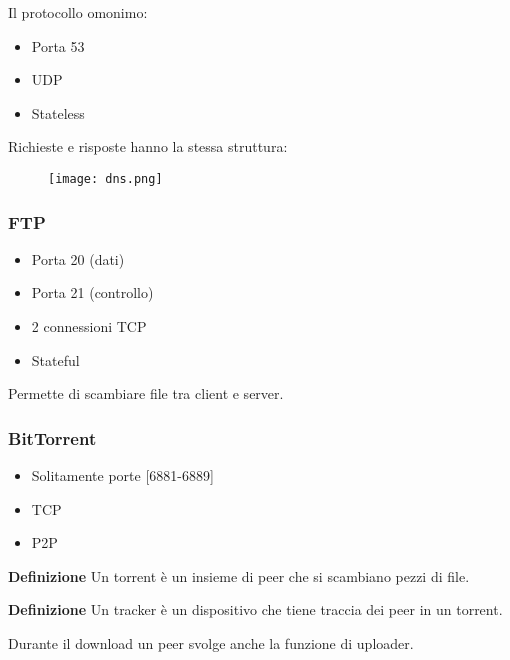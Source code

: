 \documentclass{article}
\begin{document}
\noindent Il protocollo omonimo:
\begin{itemize}
    \item Porta 53
    \item UDP
    \item Stateless\newline
\end{itemize}

\noindent Richieste e risposte hanno la stessa struttura:

\begin{figure}[ht]
    \centering
    \texttt{[image: dns.png]}
    \label{fig:dns}
\end{figure}

\newpage

\subsubsection{FTP}
\begin{itemize}
    \item Porta 20 (dati)
    \item Porta 21 (controllo)
    \item 2 connessioni TCP
    \item Stateful\newline
\end{itemize}

\noindent Permette di scambiare file tra client e server.\newline

\subsubsection{BitTorrent}
\begin{itemize}
    \item Solitamente porte [6881-6889]
    \item TCP
    \item P2P\newline
\end{itemize}

\noindent\textbf{Definizione} Un torrent è un insieme di peer che si scambiano pezzi di file.\newline

\noindent\textbf{Definizione} Un tracker è un dispositivo che tiene traccia dei peer in un torrent.\newline

\noindent Durante il download un peer svolge anche la funzione di uploader.\newline
\end{document}
